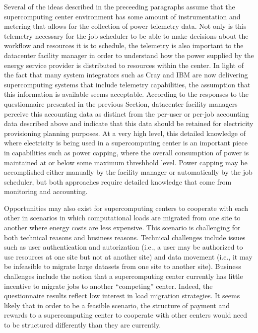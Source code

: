 Several of the ideas described in the preceeding paragraphs assume
that the supercomputing center environment has some amount of
instrumentation and metering that allows for the collection of power
telemetry data.  Not only is this telemetry necessary for the job
scheduler to be able to make decisions about the workflow and
resources it is to schedule, the telemetry is also important to the
datacenter facility manager in order to understand how the power
supplied by the energy service provider is distributed to resources
within the center.  In light of the fact that many system integrators
such as Cray and IBM are now delivering supercomputing systems that
include telemetry capabilities, the assumption that this information
is available seems acceptable.  According to the responses to the
questionnaire presented in the previous Section, datacenter facility
managers perceive this accounting data as distinct from the per-user
or per-job accounting data described above and indicate that this
data should be retained for electricity provisioning planning purposes.
At a very high level, this detailed knowledge of where electricity is
being used in a supercomputing center is an important piece in
capabilities such as power capping, where the overall consumption of
power is maintained at or below some maximum threshhold level.  Power
capping may be accomplished either manually by the facility manager
or automatically by the job scheduler, but both approaches require
detailed knowledge that come from monitoring and accounting.

Opportunities may also exist for supercomputing centers to cooperate
with each other in scenarios in which computational loads are migrated
from one site to another where energy costs are less expensive.  This
scenario is challenging for both technical reasons and business reasons.
Technical challenges include issues such as user authentication and
autorization (i.e., a user may be authorized to use resources at one
site but not at another site) and data movement (i.e., it may be
infeasible to migrate large datasets from one site to another site).
Business challenges include the notion that a supercomputing center
currently has little incentive to migrate jobs to another ``competing''
center.  Indeed, the questionnaire results reflect low interest in
load migration strategies.  It seems likely that in order to be a
feasible scenario, the structure of payment and rewards to a
supercomputing center to cooperate with other centers would need to
be structured differently than they are currently.


